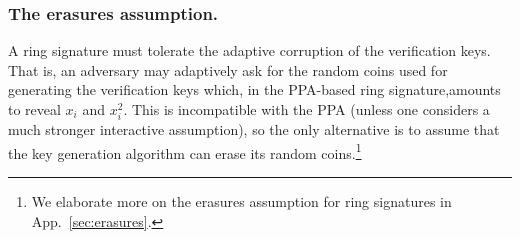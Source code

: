 

\subsubsection{The erasures assumption.}
A ring signature must tolerate the adaptive corruption of the verification keys. That is, an adversary may adaptively ask for the random coins used for generating the verification keys which, in the PPA-based ring signature,amounts to reveal $x_i$ and $x_i^2$. This is incompatible with the PPA (unless one considers a much stronger interactive assumption), so the only alternative is to assume that the key generation algorithm can erase its random coins.\footnote{We elaborate more on the erasures assumption for ring signatures in App.~\ref{sec:erasures}.}

